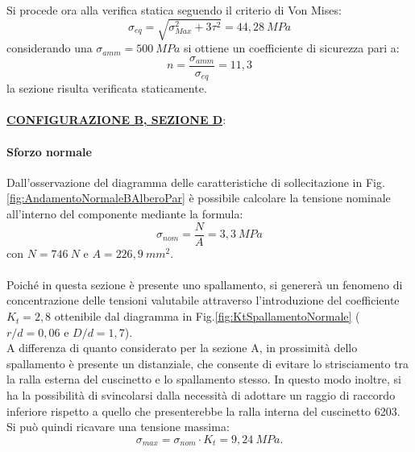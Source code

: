 Si procede ora alla verifica statica seguendo il criterio di Von Mises:
\begin{equation}
    \sigma_{eq}=\sqrt{\sigma_{Max}^2+3\tau^2}=44,28\ MPa
\end{equation}
considerando una $\sigma_{amm}=500\ MPa$ si ottiene un coefficiente di sicurezza pari a:
\begin{equation}
    n=\frac{\sigma_{amm}}{\sigma_{eq}}=11,3
\end{equation}
la sezione risulta verificata staticamente.\\
\\
\underline{\textbf{CONFIGURAZIONE B, SEZIONE D}}:
\paragraph{Sforzo normale} Dall'osservazione del diagramma delle caratteristiche di sollecitazione in Fig.\ref{fig:AndamentoNormaleBAlberoPar} è possibile calcolare la tensione nominale all'interno del componente mediante la formula:
\begin{equation}
    \sigma_{nom}=\frac{N}{A}=3,3\ MPa
\end{equation}
con $N=746\ N$ e $A=226,9\ mm^2$.\\
\\
Poiché in questa sezione è presente uno spallamento, si genererà un fenomeno di concentrazione delle tensioni valutabile attraverso l'introduzione del coefficiente $K_t=2,8$ ottenibile dal diagramma in Fig.\ref{fig:KtSpallamentoNormale} ($r/d=0,06$ e $D/d=1,7$).\\
A differenza di quanto considerato per la sezione A, in prossimità dello spallamento è presente un distanziale, che consente di evitare lo strisciamento tra la ralla esterna del cuscinetto e lo spallamento stesso. In questo modo inoltre, si ha la possibilità di svincolarsi dalla necessità di adottare un raggio di raccordo inferiore rispetto a quello che presenterebbe la ralla interna del cuscinetto 6203. \\
Si può quindi ricavare una tensione massima:
\begin{equation}
    \sigma_{max}=\sigma_{nom}\cdot K_t=9,24\ MPa.
\end{equation}
